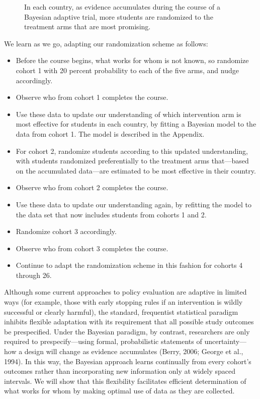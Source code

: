 \documentclass{acm_proc_article-sp}
\begin{document}
\begin{figure}
\centering
{}
\caption{In each country, as evidence accumulates during the course of a Bayesian adaptive trial, more students are randomized to the treatment arms that are most promising.}
\label{fig:timeline2}
\end{figure}

We learn as we go, adapting our randomization scheme as follows:
\begin{itemize}
    \item Before the course begins, what works for whom is not known, so randomize cohort 1 with 20 percent probability to each of the five arms, and nudge accordingly.
    \item Observe who from cohort 1 completes the course.
    \item Use these data to update our understanding of which intervention arm is most effective for students in each country, by fitting a Bayesian model to the data from cohort 1. The model is described in the Appendix.
    \item For cohort 2, randomize students according to this updated understanding, with students randomized preferentially to the treatment arms that—based on the accumulated data—are estimated to be most effective in their country.
    \item Observe who from cohort 2 completes the course.
    \item Use these data to update our understanding again, by refitting the model to the data set that now includes students from cohorts 1 and 2.
    \item Randomize cohort 3 accordingly.
    \item Observe who from cohort 3 completes the course.
    \item Continue to adapt the randomization scheme in this fashion for cohorts 4 through 26.
\end{itemize}

Although some current approaches to policy evaluation are adaptive in limited ways (for example, those with early stopping rules if an intervention is wildly successful or clearly harmful), the standard, frequentist statistical paradigm inhibits flexible adaptation with its requirement that all possible study outcomes be prespecified. Under the Bayesian paradigm, by contrast, researchers are only required to prespecify—using formal, probabilistic statements of uncertainty—how a design will change as evidence accumulates (Berry, 2006; George et al., 1994). In this way, the Bayesian approach learns continually from every cohort’s outcomes rather than incorporating new information only at widely spaced intervals. We will show that this flexibility facilitates efficient determination of what works for whom by making optimal use of data as they are collected.
\end{document}
